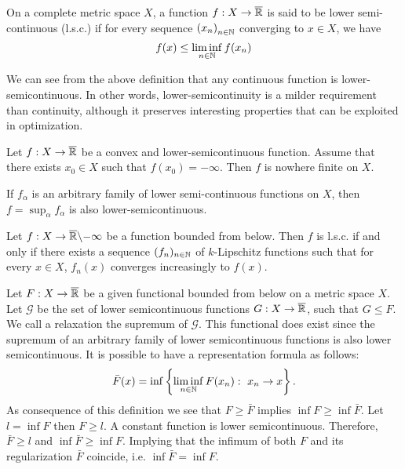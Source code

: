 \begin{definition}
	On a complete metric space $X$, a function $f: X\rightarrow\overline{\mathbb{R}}$ is said to be lower semi-continuous (l.s.c.) if for every sequence $\left( x_n \right)_{n\in\mathbb{N}}$ converging to $x\in X$, we have 
	\begin{equation*}
	f(x)\leq \liminf_{n\in \mathbb{N}} f(x_n)
	\end{equation*}
\end{definition}

We can see from the above definition that any continuous function is lower-semicontinuous. In other words, lower-semicontinuity is a milder requirement than continuity, although it preserves interesting properties that can be exploited in optimization.  

\begin{proposition}
	Let $f: X \rightarrow \overline{\mathbb{R}}$ be a convex and lower-semicontinuous function.
	Assume that there exists $x_0 \in X$ such that $f(x_0) = -\infty$. Then $f$ is nowhere finite on $X$.
\end{proposition} 


\begin{theorem} If $ f_\alpha $ is an arbitrary family of lower semi-continuous functions on $X$, then $f=\sup_\alpha f_\alpha$ is also lower-semicontinuous.
\end{theorem}


\begin{definition}

\end{definition}

\begin{theorem}
	Let $f:X\rightarrow \overline{\mathbb{R}}\backslash{-\infty}$ be a function bounded from below. Then $f$ is l.s.c. if and only if there exists a sequence $(f_n)_{n\in \mathbb{N}}$ of $k$-Lipschitz functions such that for every $x\in X$, $f_n(x)$ converges increasingly to $f(x)$.
\end{theorem}

\begin{definition}
	Let $F:X\rightarrow \overline{\mathbb{R}}$ be a given functional bounded from below on a metric space $X$.  Let $\mathcal G$ be the set of lower semicontinuous functions $G: X\rightarrow \overline{\mathbb{R}}$, such that $G\leq F$. We call a relaxation the supremum of $\mathcal G$.  This functional does exist since the supremum of an arbitrary family of lower semicontinuous functions is also lower semicontinuous. It is possible to have a representation formula as follows:
	\begin{equation}
	\bar F(x) = \inf \left\lbrace \liminf_{n\in \mathbb{N}} F(x_n):\ x_n\rightarrow x \right\rbrace.
	\end{equation}
	As consequence of this definition we see that $F \geq \bar F$ implies $\inf F \geq \inf \bar F$. Let $l=\inf F$ then $F\geq l$. A constant function is lower semicontinuous. Therefore, $\bar F \geq l$ and $\inf \bar F \geq \inf F$. Implying that the infimum of both $F$ and its regularization $\bar F$ coincide, i.e. $\inf \bar F = \inf F$. 
\end{definition}


